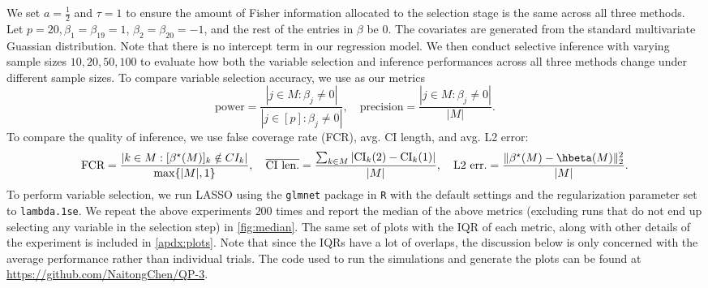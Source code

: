 We set $a = \frac{1}{2}$ and $\tau=1$ to ensure the amount of Fisher information allocated to the selection stage is the same across all three methods. Let $p=20, \beta_1=\beta_{19}=1$, $\beta_2=\beta_{20}=-1$, and the rest of the entries in $\beta$ be $0$. The covariates are generated from the standard multivariate Guassian distribution. Note that there is no intercept term in our regression model. We then conduct selective inference with varying sample sizes $10, 20, 50, 100$ to evaluate how both the variable selection and inference performances across all three methods change under different sample sizes. To compare variable selection accuracy, we use as our metrics
\[
\text{power} = \frac{|j\in M: \beta_j \neq 0|}{|j\in [p]: \beta_j \neq 0|}, \quad \text{precision} = \frac{|j\in M: \beta_j \neq 0|}{|M|}.
\]
To compare the quality of inference, we use false coverage rate (FCR), avg. CI length, and avg. L2 error:
\[
\text{FCR} = \frac{|k\in M: [\beta^\star(M)]_k \notin CI_k|}{\max\{|M|, 1\}}, \quad \overline{\text{CI len.}} = \frac{\sum_{k\in M} |\text{CI}_k(2) - \text{CI}_k(1)|}{|M|}, \quad \text{L2 err.} = \frac{\| \beta^\star(M) - \hbeta(M) \|_2^2}{|M|}.
\]
To perform variable selection, we run LASSO using the \texttt{glmnet} package in \texttt{R} with the default settings and the regularization parameter set to \texttt{lambda.1se}. We repeat the above experiments $200$ times and report the median of the above metrics (excluding runs that do not end up selecting any variable in the selection step) in \cref{fig:median}. The same set of plots with the IQR of each metric, along with other details of the experiment is included in \cref{apdx:plots}. Note that since the IQRs have a lot of overlaps, the discussion below is only concerned with the average performance rather than individual trials. The code used to run the simulations and generate the plots can be found at \url{https://github.com/NaitongChen/QP-3}.


